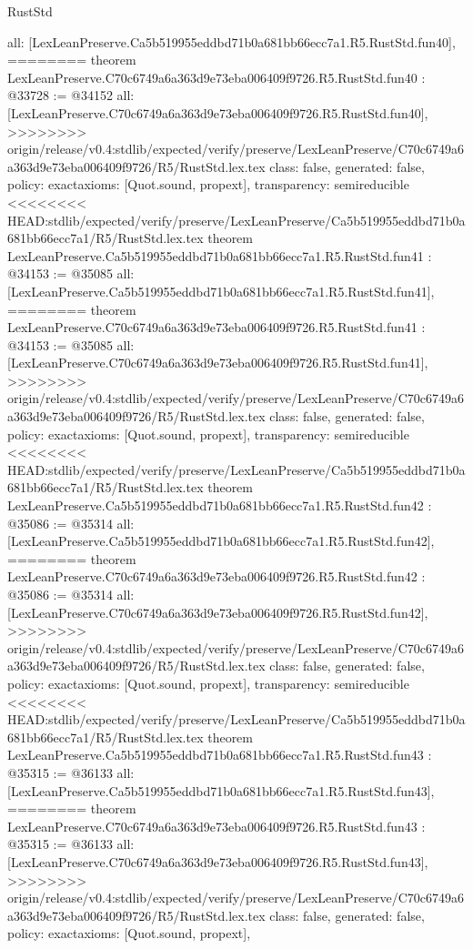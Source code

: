 \begin{lexlean}{RustStd}
\begin{coremodule}
{\begin{coremodule}
{{{{{{{{{{{{{{{{{{{{{{{{{{{{{{{{{{{{{{{{{{{  all: [LexLeanPreserve.Ca5b519955eddbd71b0a681bb66ecc7a1.R5.RustStd.fun40],
========
theorem LexLeanPreserve.C70c6749a6a363d9e73eba006409f9726.R5.RustStd.fun40 : @33728 := @34152 {
  all: [LexLeanPreserve.C70c6749a6a363d9e73eba006409f9726.R5.RustStd.fun40],
>>>>>>>> origin/release/v0.4:stdlib/expected/verify/preserve/LexLeanPreserve/C70c6749a6a363d9e73eba006409f9726/R5/RustStd.lex.tex
  class: false,
  generated: false,
  policy: exact{axioms: [Quot.sound, propext]},
  transparency: semireducible
}
<<<<<<<< HEAD:stdlib/expected/verify/preserve/LexLeanPreserve/Ca5b519955eddbd71b0a681bb66ecc7a1/R5/RustStd.lex.tex
theorem LexLeanPreserve.Ca5b519955eddbd71b0a681bb66ecc7a1.R5.RustStd.fun41 : @34153 := @35085 {
  all: [LexLeanPreserve.Ca5b519955eddbd71b0a681bb66ecc7a1.R5.RustStd.fun41],
========
theorem LexLeanPreserve.C70c6749a6a363d9e73eba006409f9726.R5.RustStd.fun41 : @34153 := @35085 {
  all: [LexLeanPreserve.C70c6749a6a363d9e73eba006409f9726.R5.RustStd.fun41],
>>>>>>>> origin/release/v0.4:stdlib/expected/verify/preserve/LexLeanPreserve/C70c6749a6a363d9e73eba006409f9726/R5/RustStd.lex.tex
  class: false,
  generated: false,
  policy: exact{axioms: [Quot.sound, propext]},
  transparency: semireducible
}
<<<<<<<< HEAD:stdlib/expected/verify/preserve/LexLeanPreserve/Ca5b519955eddbd71b0a681bb66ecc7a1/R5/RustStd.lex.tex
theorem LexLeanPreserve.Ca5b519955eddbd71b0a681bb66ecc7a1.R5.RustStd.fun42 : @35086 := @35314 {
  all: [LexLeanPreserve.Ca5b519955eddbd71b0a681bb66ecc7a1.R5.RustStd.fun42],
========
theorem LexLeanPreserve.C70c6749a6a363d9e73eba006409f9726.R5.RustStd.fun42 : @35086 := @35314 {
  all: [LexLeanPreserve.C70c6749a6a363d9e73eba006409f9726.R5.RustStd.fun42],
>>>>>>>> origin/release/v0.4:stdlib/expected/verify/preserve/LexLeanPreserve/C70c6749a6a363d9e73eba006409f9726/R5/RustStd.lex.tex
  class: false,
  generated: false,
  policy: exact{axioms: [Quot.sound, propext]},
  transparency: semireducible
}
<<<<<<<< HEAD:stdlib/expected/verify/preserve/LexLeanPreserve/Ca5b519955eddbd71b0a681bb66ecc7a1/R5/RustStd.lex.tex
theorem LexLeanPreserve.Ca5b519955eddbd71b0a681bb66ecc7a1.R5.RustStd.fun43 : @35315 := @36133 {
  all: [LexLeanPreserve.Ca5b519955eddbd71b0a681bb66ecc7a1.R5.RustStd.fun43],
========
theorem LexLeanPreserve.C70c6749a6a363d9e73eba006409f9726.R5.RustStd.fun43 : @35315 := @36133 {
  all: [LexLeanPreserve.C70c6749a6a363d9e73eba006409f9726.R5.RustStd.fun43],
>>>>>>>> origin/release/v0.4:stdlib/expected/verify/preserve/LexLeanPreserve/C70c6749a6a363d9e73eba006409f9726/R5/RustStd.lex.tex
  class: false,
  generated: false,
  policy: exact{axioms: [Quot.sound, propext]},
}}}}}}}}}}}}}}}}}}}}}}}}}}}}}}}}}}}}}}}}}}}}}}}
\end{coremodule}}
\end{coremodule}
\end{lexlean}
